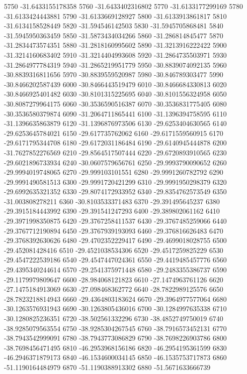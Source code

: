 {5750 -31.6433155178358
5760 -31.6433402316802
5770 -31.6133177299169
5780 -31.6133424443881
5790 -31.6133669128927
5800 -31.6133913861817
5810 -31.6134158528449
5820 -31.594546142503
5830 -31.5945705868481
5840 -31.5945950363459
5850 -31.5873434034266
5860 -31.286814845477
5870 -31.2834473574351
5880 -31.2818160995602
5890 -31.3213916222422
5900 -31.3214160683402
5910 -31.3214404993608
5920 -31.2864735503971
5930 -31.2864977784319
5940 -31.2865219951779
5950 -30.8839074092135
5960 -30.8839316811656
5970 -30.8839559520987
5980 -30.846789303477
5990 -30.8466202587439
6000 -30.8466443519479
6010 -30.8466684330813
6020 -30.8466925401482
6030 -30.8101315225695
6040 -30.8101556324958
6050 -30.8087279964175
6060 -30.3536590516387
6070 -30.3536831775405
6080 -30.3536580379874
6090 -31.2064711865441
6100 -31.1396394758595
6110 -31.1396635863879
6120 -31.1396876973506
6130 -29.6253404630565
6140 -29.6253645784021
6150 -29.617735762062
6160 -29.6171559560915
6170 -29.6171795344708
6180 -29.6172031186484
6190 -29.6140945444878
6200 -31.7627852276569
6210 -29.8564517507444
6220 -29.6720893910565
6230 -29.6021896733934
6240 -30.0607579656761
6250 -29.9993790090652
6260 -29.9994019748065
6270 -29.999103101551
6280 -29.9991260782792
6290 -29.9991490581513
6300 -29.9991720421299
6310 -29.9991950298379
6320 -29.6992635321352
6330 -29.8074172933952
6340 -29.8354762573549
6350 -31.003808278211
6360 -30.8103533371483
6370 -29.391495645237
6380 -29.3915184443992
6390 -29.391541247293
6400 -29.389802061162
6410 -29.3971998350875
6420 -29.3767258411537
6430 -29.3767485259066
6440 -29.3767712190894
6450 -29.3767939193093
6460 -29.376816626483
6470 -29.3768392630626
6480 -29.4702352229417
6490 -29.4699018028755
6500 -29.452081428416
6510 -29.4521038534306
6520 -29.4517259825229
6530 -29.4547222539186
6540 -29.4547447024361
6550 -29.4419485457776
6560 -29.4395340244614
6570 -29.2541375971448
6580 -29.2483355386737
6590 -29.1179979809647
6600 -28.984068121823
6610 -27.1474963761126
6620 -27.1475184913069
6630 -27.098468362772
6640 -28.7822989125576
6650 -28.7823218814943
6660 -29.4364803183624
6670 -29.3964977577064
6680 -30.1263576931943
6690 -30.1263805436016
6700 -30.1284997635338
6710 -30.1280825236351
6720 -38.502561332296
6730 -38.4852749750019
6740 -38.9285079563554
6750 -38.9285304267545
6760 -38.7916573452131
6770 -38.7943542999091
6780 -38.7943773086829
6790 -38.7698226903786
6800 -38.7698456471495
6810 -46.2953968156186
6820 -46.2954195361599
6830 -46.2946371879173
6840 -46.1534600034145
6850 -46.1535753717873
6860 -51.1190164484979
6870 -51.1190388913302
6880 -51.5671633666739
}

